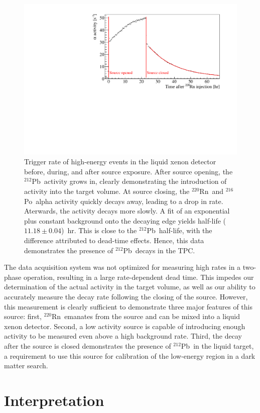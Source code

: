 \begin{figure}[htb]
\centering
    \includegraphics[trim = 0 0 0 0, clip = true,width = 0.8\columnwidth]{figures/rnsource/tpc_rate.pdf}
    \caption{Trigger rate of high-energy events in the liquid xenon detector before, during, and after source exposure. After source opening, the $^{212}$Pb~activity grows in, clearly demonstrating the introduction of activity into the target volume. At source closing, the $^{220}$Rn~and $^{216}$Po~alpha activity quickly decays away, leading to a drop in rate. Aterwards, the activity decays more slowly. A fit of an exponential plus constant background onto the decaying edge yields half-life ($11.18\pm0.04$)~hr. This is close to the $^{212}$Pb~half-life, with the difference attributed to dead-time effects. Hence, this data demonstrates the presence of $^{212}$Pb~decays in the TPC.}\label{fig:rn_rates}
\end{figure}

The data acquisition system was not optimized for measuring high rates in a two-phase operation, resulting in a large rate-dependent dead time. This impedes our determination of the actual activity in the target volume, as well as our ability to accurately measure the decay rate following the closing of the source. However, this measurement is clearly sufficient to demonstrate three major features of this source: first, $^{220}$Rn~emanates from the source and can be mixed into a liquid xenon detector. Second, a low activity source is capable of introducing enough activity to be measured even above a high background rate. Third, the decay after the source is closed demonstrates the presence of $^{212}$Pb~in the liquid target, a requirement to use this source for calibration of the low-energy region in a dark matter search.

\section{Interpretation}

